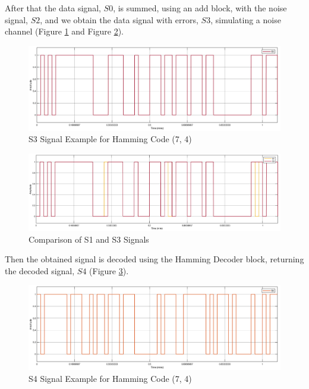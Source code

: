 \begin{refsection}
After that the data signal, $S0$, is summed, using an add block, with the noise signal, $S2$, and we obtain the data signal with errors, $S3$, simulating a noise channel (Figure \ref{fig:hammingEncoderDecoder_S3} and Figure \ref{fig:hammingEncoderDecoder_S1_S3}).

\begin{figure}[h!]
	\centering
	\includegraphics[width=.9\linewidth]{./sdf/eit_25828_hamming_channel_encoder_decoder/images/S3.png}
	\caption{S3 Signal Example for Hamming Code (7, 4)}
	\label{fig:hammingEncoderDecoder_S3}
\end{figure}

\begin{figure}[h!]
	\centering
	\includegraphics[width=.9\linewidth]{./sdf/eit_25828_hamming_channel_encoder_decoder/images/S1_S3.png}
	\caption{Comparison of S1 and S3 Signals}
	\label{fig:hammingEncoderDecoder_S1_S3}
\end{figure}

Then the obtained signal is decoded using the Hamming Decoder block, returning the decoded signal, $S4$ (Figure \ref{fig:hammingEncoderDecoder_S4}).

\begin{figure}[h!]
	\centering
	\includegraphics[width=.9\linewidth]{./sdf/eit_25828_hamming_channel_encoder_decoder/images/S4.png}
	\caption{S4 Signal Example for Hamming Code (7, 4)}
	\label{fig:hammingEncoderDecoder_S4}
\end{figure}


\end{refsection}
